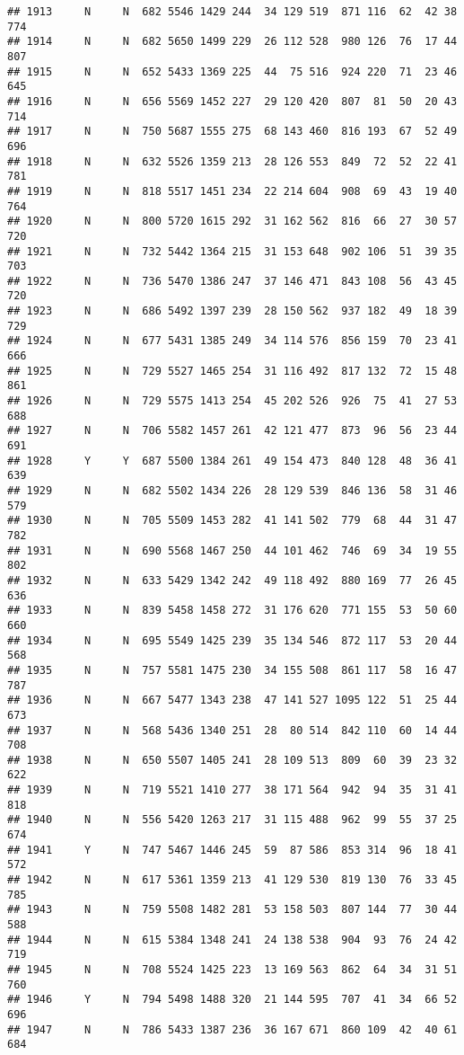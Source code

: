 \documentclass[]{article}
\begin{document}
\begin{verbatim}
## 1913     N     N  682 5546 1429 244  34 129 519  871 116  62  42 38  774
## 1914     N     N  682 5650 1499 229  26 112 528  980 126  76  17 44  807
## 1915     N     N  652 5433 1369 225  44  75 516  924 220  71  23 46  645
## 1916     N     N  656 5569 1452 227  29 120 420  807  81  50  20 43  714
## 1917     N     N  750 5687 1555 275  68 143 460  816 193  67  52 49  696
## 1918     N     N  632 5526 1359 213  28 126 553  849  72  52  22 41  781
## 1919     N     N  818 5517 1451 234  22 214 604  908  69  43  19 40  764
## 1920     N     N  800 5720 1615 292  31 162 562  816  66  27  30 57  720
## 1921     N     N  732 5442 1364 215  31 153 648  902 106  51  39 35  703
## 1922     N     N  736 5470 1386 247  37 146 471  843 108  56  43 45  720
## 1923     N     N  686 5492 1397 239  28 150 562  937 182  49  18 39  729
## 1924     N     N  677 5431 1385 249  34 114 576  856 159  70  23 41  666
## 1925     N     N  729 5527 1465 254  31 116 492  817 132  72  15 48  861
## 1926     N     N  729 5575 1413 254  45 202 526  926  75  41  27 53  688
## 1927     N     N  706 5582 1457 261  42 121 477  873  96  56  23 44  691
## 1928     Y     Y  687 5500 1384 261  49 154 473  840 128  48  36 41  639
## 1929     N     N  682 5502 1434 226  28 129 539  846 136  58  31 46  579
## 1930     N     N  705 5509 1453 282  41 141 502  779  68  44  31 47  782
## 1931     N     N  690 5568 1467 250  44 101 462  746  69  34  19 55  802
## 1932     N     N  633 5429 1342 242  49 118 492  880 169  77  26 45  636
## 1933     N     N  839 5458 1458 272  31 176 620  771 155  53  50 60  660
## 1934     N     N  695 5549 1425 239  35 134 546  872 117  53  20 44  568
## 1935     N     N  757 5581 1475 230  34 155 508  861 117  58  16 47  787
## 1936     N     N  667 5477 1343 238  47 141 527 1095 122  51  25 44  673
## 1937     N     N  568 5436 1340 251  28  80 514  842 110  60  14 44  708
## 1938     N     N  650 5507 1405 241  28 109 513  809  60  39  23 32  622
## 1939     N     N  719 5521 1410 277  38 171 564  942  94  35  31 41  818
## 1940     N     N  556 5420 1263 217  31 115 488  962  99  55  37 25  674
## 1941     Y     N  747 5467 1446 245  59  87 586  853 314  96  18 41  572
## 1942     N     N  617 5361 1359 213  41 129 530  819 130  76  33 45  785
## 1943     N     N  759 5508 1482 281  53 158 503  807 144  77  30 44  588
## 1944     N     N  615 5384 1348 241  24 138 538  904  93  76  24 42  719
## 1945     N     N  708 5524 1425 223  13 169 563  862  64  34  31 51  760
## 1946     Y     N  794 5498 1488 320  21 144 595  707  41  34  66 52  696
## 1947     N     N  786 5433 1387 236  36 167 671  860 109  42  40 61  684

\end{verbatim}
\end{document}
